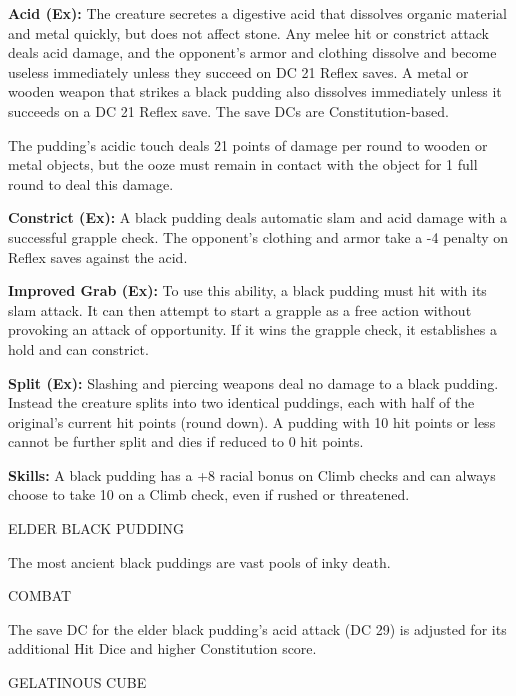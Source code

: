 \documentclass{article}
\begin{document}
\textbf{Acid (Ex):} The creature secretes a digestive acid that dissolves organic 
material and metal quickly, but does not affect stone. Any melee hit or constrict 
attack deals acid damage, and the opponent's armor and clothing dissolve and become 
useless immediately unless they succeed on DC 21 Reflex saves. A metal or wooden 
weapon that strikes a black pudding also dissolves immediately unless it succeeds 
on a DC 21 Reflex save. The save DCs are Constitution-based.

The pudding's acidic touch deals 21 points of damage per round to wooden or metal 
objects, but the ooze must remain in contact with the object for 1 full round to 
deal this damage.

\textbf{Constrict (Ex): }A black pudding deals automatic slam and acid damage with 
a successful grapple check. The opponent's clothing and armor take a -4 penalty 
on Reflex saves against the acid.

\textbf{Improved Grab (Ex): }To use this ability, a black pudding must hit with 
its slam attack. It can then attempt to start a grapple as a free action without 
provoking an attack of opportunity. If it wins the grapple check, it establishes 
a hold and can constrict.

\textbf{Split (Ex): }Slashing and piercing weapons deal no damage to a black pudding. 
Instead the creature splits into two identical puddings, each with half of the 
original's current hit points (round down). A pudding with 10 hit points or less 
cannot be further split and dies if reduced to 0 hit points.

\textbf{Skills:} A black pudding has a +8 racial bonus on Climb checks and can 
always choose to take 10 on a Climb check, even if rushed or threatened.

\vspace{12pt}
ELDER BLACK PUDDING

The most ancient black puddings are vast pools of inky death.

COMBAT

The save DC for the elder black pudding's acid attack (DC 29) is adjusted for its 
additional Hit Dice and higher Constitution score.

\vspace{12pt}
GELATINOUS CUBE
\end{document}

